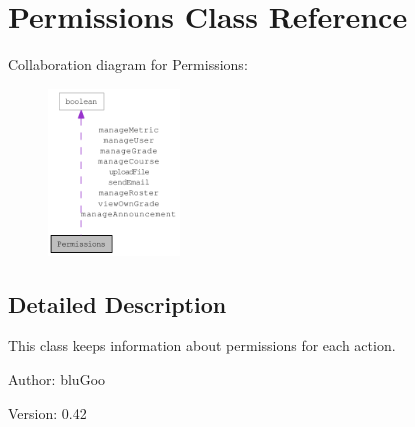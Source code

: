 \hypertarget{classPermissions}{
\section{Permissions Class Reference}
\label{classPermissions}
}
Collaboration diagram for Permissions:\nopagebreak
\begin{figure}[H]
\begin{center}
\leavevmode
\includegraphics[width=99pt]{classPermissions__coll__graph}
\end{center}
\end{figure}


\subsection{Detailed Description}
This class keeps information about permissions for each action. 

\begin{Desc}
\item[Author:]bluGoo \end{Desc}
\begin{Desc}
\item[Version:]0.42 \end{Desc}


